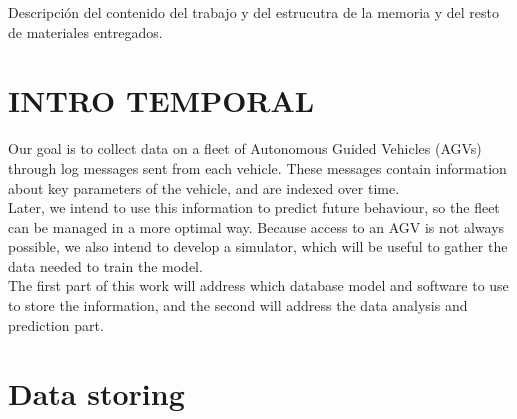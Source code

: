 
Descripción del contenido del trabajo y del estrucutra de la memoria y del resto de materiales entregados.


\section{INTRO TEMPORAL}

Our goal is to collect data on a fleet of Autonomous Guided Vehicles (AGVs) through log messages sent from each vehicle. 
These messages contain information about key parameters of the vehicle, and are indexed over time.\\
Later, we intend to use this information to predict future behaviour, so the fleet can be managed in a more optimal way. 
Because access to an AGV is not always possible, we also intend to develop a simulator, which will be useful to gather the data needed to train the model.\\
The first part of this work will address which database model and software to use to store the information, and the second will address the data analysis and prediction part.

\section{Data storing}
